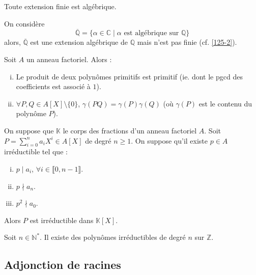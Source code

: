 	\begin{proposition}
		Toute extension finie est algébrique.
	\end{proposition}
	
	\begin{cexample}
		\label{125-1}
		On considère
		\[ \overline{\mathbb{Q}} = \{ \alpha \in \mathbb{C} \mid \alpha \text{ est algébrique sur } \mathbb{Q} \} \]
		alors, $\overline{\mathbb{Q}}$ est une extension algébrique de $\mathbb{Q}$ mais n'est pas finie (cf. \cref{125-2}).
	\end{cexample}
	
	
	\begin{lemma}[Gauss]
		Soit $A$ un anneau factoriel. Alors :
		\begin{enumerate}[(i)]
			\item Le produit de deux polynômes primitifs est primitif (ie. dont le pgcd des coefficients est associé à $1$).
			\item $\forall P, Q \in A[X] \setminus \{ 0 \}$, $\gamma(PQ) = \gamma(P) \gamma(Q)$ (où $\gamma(P)$ est le contenu du polynôme $P$).
		\end{enumerate}
	\end{lemma}
	
	
	\begin{theorem}
		On suppose que $\mathbb{K}$ le corps des fractions d'un anneau factoriel $A$. Soit $P = \sum_{i=0}^n a_i X^i \in A[X]$ de degré $n \geq 1$. On suppose qu'il existe $p \in A$ irréductible tel que :
		\begin{enumerate}[(i)]
			\item $p \mid a_i$, $\forall i \in \llbracket 0, n-1 \rrbracket$.
			\item $p \nmid a_n$.
			\item $p^2 \nmid a_0$.
		\end{enumerate}
		Alors $P$ est irréductible dans $\mathbb{K}[X]$.
	\end{theorem}
	

	\begin{application}
		\label{125-2}
		Soit $n \in \mathbb{N}^*$. Il existe des polynômes irréductibles de degré $n$ sur $\mathbb{Z}$.
	\end{application}
	
	\subsection{Adjonction de racines}
	
